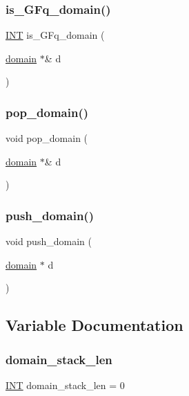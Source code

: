 \mbox{\label{domain_8_c_af695b4599bda7a0400772172c9eeff64}} 
\subsubsection{\texorpdfstring{is\+\_\+\+G\+Fq\+\_\+domain()}{is\_GFq\_domain()}}
{\footnotesize\ttfamily \mbox{\hyperlink{galois_8h_a09fddde158a3a20bd2dcadb609de11dc}{I\+NT}} is\+\_\+\+G\+Fq\+\_\+domain (\begin{DoxyParamCaption}\item[{\mbox{\hyperlink{classdomain}{domain}} $\ast$\&}]{d }\end{DoxyParamCaption})}

\mbox{\label{domain_8_c_a027eabe47e9f5305f32b0328275ac612}} 
\subsubsection{\texorpdfstring{pop\+\_\+domain()}{pop\_domain()}}
{\footnotesize\ttfamily void pop\+\_\+domain (\begin{DoxyParamCaption}\item[{\mbox{\hyperlink{classdomain}{domain}} $\ast$\&}]{d }\end{DoxyParamCaption})}

\mbox{\label{domain_8_c_a73ae34a3de396002ddf3058ff7ffc1ec}} 
\subsubsection{\texorpdfstring{push\+\_\+domain()}{push\_domain()}}
{\footnotesize\ttfamily void push\+\_\+domain (\begin{DoxyParamCaption}\item[{\mbox{\hyperlink{classdomain}{domain}} $\ast$}]{d }\end{DoxyParamCaption})}



\subsection{Variable Documentation}
\mbox{\label{domain_8_c_a16066eba3c866cb060da7f60521a281a}} 
\subsubsection{\texorpdfstring{domain\+\_\+stack\+\_\+len}{domain\_stack\_len}}
{\footnotesize\ttfamily \mbox{\hyperlink{galois_8h_a09fddde158a3a20bd2dcadb609de11dc}{I\+NT}} domain\+\_\+stack\+\_\+len = 0}

